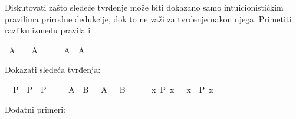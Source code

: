 \begin{isabellebody}
\begin{exercise}[subtitle=Klasična pravilo prirodne dedukcije: ccontr.]
%
\begin{isamarkuptext}%
Diskutovati zašto sledeće tvrđenje može biti dokazano samo intuicionističkim pravilima 
      prirodne dedukcije, dok to ne važi za tvrđenje nakon njega. Primetiti razliku između 
      pravila  i .%
\end{isamarkuptext}\isamarkuptrue%
\isamarkupfalse%
\ {\isacartoucheopen}A\ {\isasymlongrightarrow}\ {\isasymnot}\ {\isasymnot}\ A{\isacartoucheclose}\isanewline
\ \ %
\isadelimproof
%
\endisadelimproof
%
\isatagproof
%
\endisatagproof
{\isafoldproof}%
%
\isadelimproof
%
\endisadelimproof
\isanewline
{}\isamarkupfalse%
\ {\isachardoublequoteopen}{\isasymnot}\ {\isasymnot}\ A\ {\isasymlongrightarrow}\ A{\isachardoublequoteclose}\isanewline
\ \ %
\isadelimproof
%
\endisadelimproof
%
\isatagproof
%
\endisatagproof
{\isafoldproof}%
%
\isadelimproof
%
\endisadelimproof
%
\begin{isamarkuptext}%
Dokazati sledeća tvrđenja:%
\end{isamarkuptext}\isamarkuptrue%
\isamarkupfalse%
\ {\isachardoublequoteopen}{\isacharparenleft}{\kern0pt}{\isasymnot}\ P\ {\isasymlongrightarrow}\ P{\isacharparenright}{\kern0pt}\ {\isasymlongrightarrow}\ P{\isachardoublequoteclose}\isanewline
\ \ %
\isadelimproof
%
\endisadelimproof
%
\isatagproof
%
\endisatagproof
{\isafoldproof}%
%
\isadelimproof
%
\endisadelimproof
\isanewline
{}\isamarkupfalse%
\ {\isachardoublequoteopen}{\isasymnot}\ {\isacharparenleft}{\kern0pt}A\ {\isasymand}\ B{\isacharparenright}{\kern0pt}\ {\isasymlongrightarrow}\ {\isasymnot}\ A\ {\isasymor}\ {\isasymnot}\ B{\isachardoublequoteclose}\isanewline
\ \ %
\isadelimproof
%
\endisadelimproof
%
\isatagproof
%
\endisatagproof
{\isafoldproof}%
%
\isadelimproof
%
\endisadelimproof
\isanewline
{}\isamarkupfalse%
\ {\isachardoublequoteopen}{\isacharparenleft}{\kern0pt}{\isasymnot}\ {\isacharparenleft}{\kern0pt}{\isasymforall}\ x{\isachardot}{\kern0pt}\ P\ x{\isacharparenright}{\kern0pt}{\isacharparenright}{\kern0pt}\ {\isasymlongrightarrow}\ {\isacharparenleft}{\kern0pt}{\isasymexists}\ x{\isachardot}{\kern0pt}\ {\isasymnot}\ P\ x{\isacharparenright}{\kern0pt}{\isachardoublequoteclose}\isanewline
\ \ %
\isadelimproof
%
\endisadelimproof
%
\isatagproof
%
\endisatagproof
{\isafoldproof}%
%
\isadelimproof
%
\endisadelimproof
%
\begin{isamarkuptext}%
Dodatni primeri:%
\end{isamarkuptext}\isamarkuptrue%
\isamarkupfalse%

\end{exercise}
\end{isabellebody}
